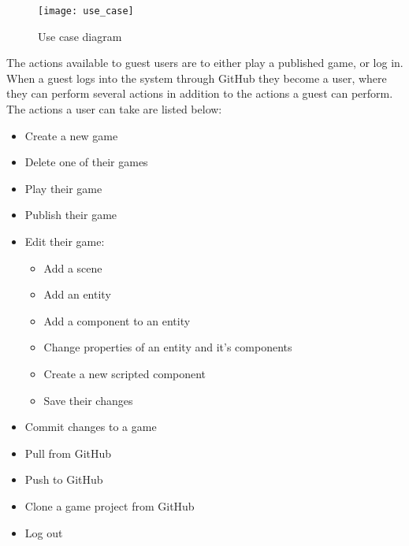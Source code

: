 \begin{figure}[h]
	\centering
	\texttt{[image: use\_case]}
	\caption{Use case diagram}
	\label{fig:usecasediagram}
\end{figure}

The actions available to guest users are to either play a published game, or log in. When a guest logs into the system through GitHub they become a user, where they can perform several actions in addition to the actions a guest can perform. The actions a user can take are listed below:

\begin{itemize}
	\item Create a new game
	\item Delete one of their games
	\item Play their game
	\item Publish their game
	\item Edit their game:
	\begin{itemize}
		\item Add a scene
		\item Add an entity
		\item Add a component to an entity
		\item Change properties of an entity and it's components
		\item Create a new scripted component
		\item Save their changes
	\end{itemize}
	\item Commit changes to a game
	\item Pull from GitHub
	\item Push to GitHub
	\item Clone a game project from GitHub
	\item Log out
\end{itemize}

